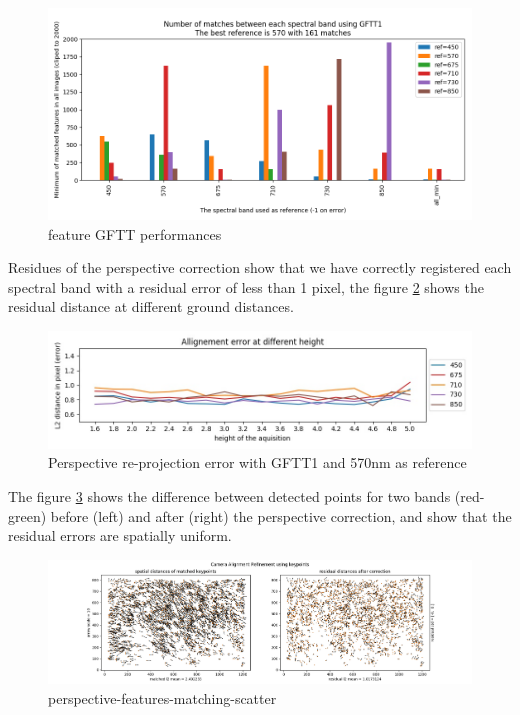 \documentclass[]{elsarticle}
\begin{document}
	\begin{figure}[H]
		\centering
		\includegraphics[width=0.9\linewidth]{../figures/comparaison-keypoint-matching-reference-GFTT1.png}
		\caption{feature GFTT performances}
		\label{fig:features-GFTT-performances}
	\end{figure}
	
	\par Residues of the perspective correction show that we have correctly registered each spectral band with a residual error of less than 1 pixel,
	the figure \ref{fig:perspective-error} shows the residual distance at different ground distances.
	
	\begin{figure}[H]
		\centering
		\includegraphics[width=0.8\linewidth]{../figures/prespective-allignement-rmse.jpg}
		\caption{Perspective re-projection error with GFTT1 and 570nm as reference}
		\label{fig:perspective-error}
	\end{figure}
	
	\par The figure \ref{fig:perspective-features-matching-scatter} shows the difference between detected points for two bands (red-green)
	before (left) and after (right) the perspective correction, and show that the residual errors are spatially uniform.
	
	\begin{figure}[H]
		\centering
		\includegraphics[width=\linewidth]{../figures/perspective-features-matching-scatter.png}
		\caption{perspective-features-matching-scatter}
		\label{fig:perspective-features-matching-scatter}
	\end{figure}
	
\end{document}
